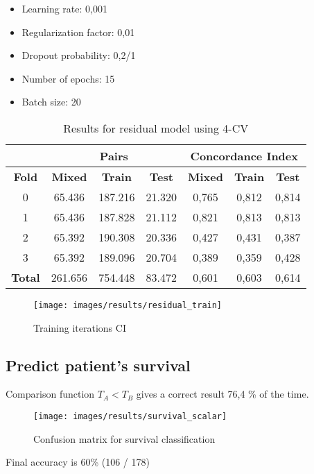 \begin{frame}
  \begin{itemize}
    \item Learning rate: 0,001
    \item Regularization factor: 0,01
    \item Dropout probability: 0,2/1
    \item Number of epochs: 15
    \item Batch size: 20
  \end{itemize}

  \begin{table}
    \centering
    \begin{tabular}{|c||c|c|c||c|c|c|}
      \cline{2-7}
      \multicolumn{1}{c|}{} & \multicolumn{3}{|c||}{\textbf{Pairs}} & 
      \multicolumn{3}{c|}{\textbf{Concordance Index}} \\
      \hline
      \textbf{Fold} & \textbf{Mixed} & \textbf{Train} & \textbf{Test} & 
      \textbf{Mixed} & \textbf{Train} & \textbf{Test} \\
      \hhline{=======}
      0 & 65.436 & 187.216 & 21.320 & 0,765 & 0,812 & 0,814 \\
      1 & 65.436 & 187.828 & 21.112 & 0,821 & 0,813 & 0,813 \\
      2 & 65.392 & 190.308 & 20.336 & 0,427 & 0,431 & 0,387 \\
      3 & 65.392 & 189.096 & 20.704 & 0,389 & 0,359 & 0,428 \\
      \hhline{=======}
      \textbf{Total} & 261.656 & 754.448 & 83.472 & 0,601 & 0,603 & 0,614 \\
      \hline
    \end{tabular}
  
    \caption[Residual 4-CV results]{
      Results for residual model using 4-CV \label{tab:results-residual-4CV}
    }
  \end{table}
\end{frame}

\begin{frame}
  \begin{figure}
    \centering
    \texttt{[image: images/results/residual\_train]}
  
    \caption{Training iterations CI
      \label{fig:results-residual-CI}
    }
  \end{figure}
\end{frame}

\subsection{Predict patient's survival}

\begin{frame}{\insertsubsec}
  Comparison function \( T_A < T_B \) gives a correct result 76,4 \% of the time.
  \begin{figure}
    \centering
    \texttt{[image: images/results/survival\_scalar]}
  
    \caption{Confusion matrix for survival classification}
  \end{figure}

  Final accuracy is 60\% (106 / 178)
\end{frame}


